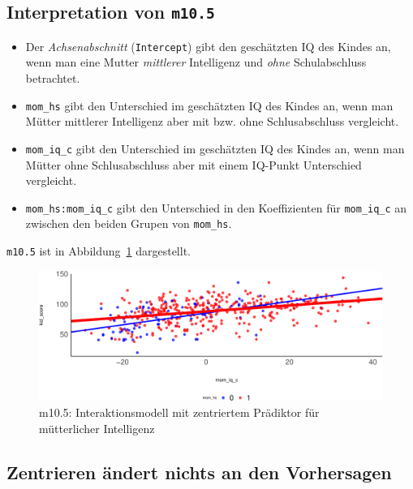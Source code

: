 \documentclass[
  a4paper,
  DIV=11]{scrreprt}
\providecommand{\tightlist}{%
  \setlength{\itemsep}{0pt}\setlength{\parskip}{0pt}}\usepackage{longtable,booktabs,array}
\theoremstyle{definition}
\theoremstyle{remark}
\begin{document}
\hypertarget{interpretation-von-m10.5}{%
\subsection{\texorpdfstring{Interpretation von
\texttt{m10.5}}{Interpretation von m10.5}}\label{interpretation-von-m10.5}}

\begin{itemize}
\tightlist
\item
  Der \emph{Achsenabschnitt} (\texttt{Intercept}) gibt den geschätzten
  IQ des Kindes an, wenn man eine Mutter \emph{mittlerer} Intelligenz
  und \emph{ohne} Schulabschluss betrachtet.
\item
  \texttt{mom\_hs} gibt den Unterschied im geschätzten IQ des Kindes an,
  wenn man Mütter mittlerer Intelligenz aber mit bzw. ohne
  Schlusabschluss vergleicht.
\item
  \texttt{mom\_iq\_c} gibt den Unterschied im geschätzten IQ des Kindes
  an, wenn man Mütter ohne Schlusabschluss aber mit einem IQ-Punkt
  Unterschied vergleicht.
\item
  \texttt{mom\_hs:mom\_iq\_c} gibt den Unterschied in den Koeffizienten
  für \texttt{mom\_iq\_c} an zwischen den beiden Grupen von
  \texttt{mom\_hs}.
\end{itemize}

\texttt{m10.5} ist in Abbildung~\ref{fig-m105} dargestellt.

\begin{figure}

{\centering \includegraphics{./metrische-AV_files/figure-pdf/fig-m105-1.pdf}

}

\caption{\label{fig-m105}m10.5: Interaktionsmodell mit zentriertem
Prädiktor für mütterlicher Intelligenz}

\end{figure}

\hypertarget{zentrieren-uxe4ndert-nichts-an-den-vorhersagen}{%
\subsection{Zentrieren ändert nichts an den
Vorhersagen}\label{zentrieren-uxe4ndert-nichts-an-den-vorhersagen}}
\end{document}
